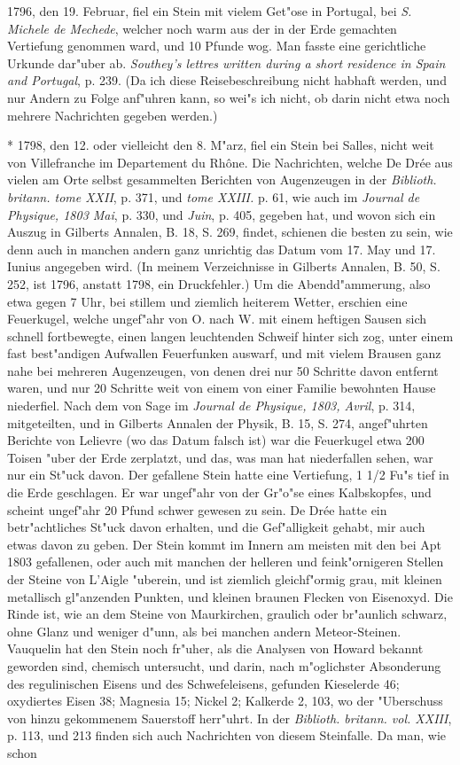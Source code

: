 \documentclass[a4paper, 11pt, oneside, polutonikogreek, german]{article}
\begin{document}
1796, den 19. Februar, fiel ein Stein mit vielem Get"ose in Portugal, bei \emph{S. Michele de Mechede}, welcher noch warm aus der in der Erde gemachten Vertiefung genommen ward, und 10 Pfunde wog. Man fasste eine gerichtliche Urkunde dar"uber ab. \emph{Southey's lettres written during a short residence in Spain and Portugal}, p. 239. (Da ich diese Reisebeschreibung nicht habhaft werden, und nur Andern zu Folge anf"uhren kann, so wei"s ich nicht, ob darin nicht etwa noch mehrere Nachrichten gegeben werden.)

* 1798, den 12. oder vielleicht den 8. M"arz, fiel ein Stein bei Salles, nicht weit von Villefranche im Departement du Rhône. Die Nachrichten, welche De Drée aus vielen am Orte selbst gesammelten Berichten von Augenzeugen in der \emph{Biblioth. britann. tome XXII}, p. 371, und \emph{tome XXIII.} p. 61, wie auch im \emph{Journal de Physique, 1803 Mai}, p. 330, und \emph{Juin}, p. 405, gegeben hat, und wovon sich ein Auszug in Gilberts Annalen, B. 18, S. 269, findet, schienen die besten zu sein, wie denn auch in manchen andern ganz unrichtig das Datum vom 17. May und 17. Iunius angegeben wird. (In meinem Verzeichnisse in Gilberts Annalen, B. 50, S. 252, ist 1796, anstatt 1798, ein Druckfehler.) Um die Abendd"ammerung, also etwa gegen 7 Uhr, bei stillem und ziemlich heiterem Wetter, erschien eine Feuerkugel, welche ungef"ahr von O. nach W. mit einem heftigen Sausen sich schnell fortbewegte, einen langen leuchtenden Schweif hinter sich zog, unter einem fast best"andigen Aufwallen Feuerfunken auswarf, und mit vielem Brausen ganz nahe bei mehreren Augenzeugen, von denen drei nur 50 Schritte davon entfernt waren, und nur 20 Schritte weit von einem von einer Familie bewohnten Hause niederfiel. Nach dem von Sage im \emph{Journal de Physique, 1803, Avril}, p. 314, mitgeteilten, und in Gilberts Annalen der Physik, B. 15, S. 274, angef"uhrten Berichte von Lelievre (wo das Datum falsch ist) war die Feuerkugel etwa 200 Toisen "uber der Erde zerplatzt, und das, was man hat niederfallen sehen, war nur ein St"uck davon. Der gefallene Stein hatte eine Vertiefung, 1 1/2 Fu"s tief in die Erde geschlagen. Er war ungef"ahr von der Gr"o"se eines Kalbskopfes, und scheint ungef"ahr 20 Pfund schwer gewesen zu sein. De Drée hatte ein betr"achtliches St"uck davon erhalten, und die Gef"alligkeit gehabt, mir auch etwas davon zu geben. Der Stein kommt im Innern am meisten mit den bei Apt 1803 gefallenen, oder auch mit manchen der helleren und feink"ornigeren Stellen der Steine von L'Aigle "uberein, und ist ziemlich gleichf"ormig grau, mit kleinen metallisch gl"anzenden Punkten, und kleinen braunen Flecken von Eisenoxyd. Die Rinde ist, wie an dem Steine von Maurkirchen, graulich oder br"aunlich schwarz, ohne Glanz und weniger d"unn, als bei manchen andern Meteor-Steinen. Vauquelin hat den Stein noch fr"uher, als die Analysen von Howard bekannt geworden sind, chemisch untersucht, und darin, nach m"oglichster Absonderung des regulinischen Eisens und des Schwefeleisens, gefunden Kieselerde 46; oxydiertes Eisen 38; Magnesia 15; Nickel 2; Kalkerde 2, 103, wo der "Uberschuss von hinzu gekommenem Sauerstoff herr"uhrt. In der \emph{Biblioth. britann. vol. XXIII}, p. 113, und 213 finden sich auch Nachrichten von diesem Steinfalle. Da man, wie schon 
\end{document}
